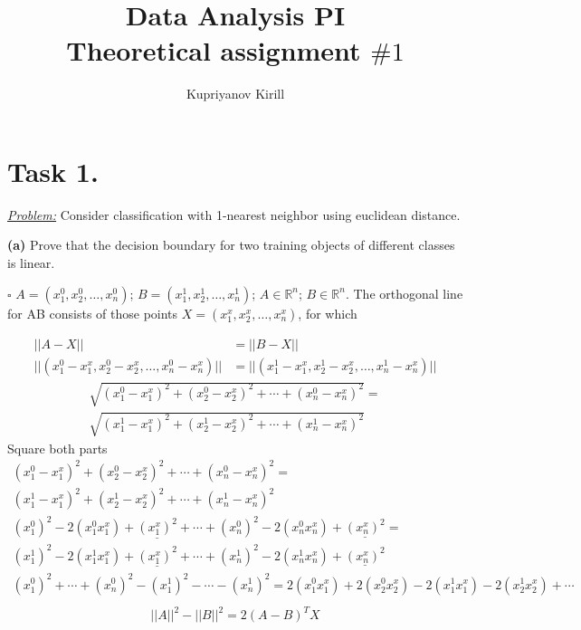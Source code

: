 \documentclass[a4paper,12pt]{article} %
\author{Kupriyanov Kirill}
\title{Data Analysis PI\\Theoretical assignment $\#1$}
\date{}
\begin{document}
\maketitle
\thispagestyle{empty}
\newpage
\section*{Task 1.}
\underline{\textit{Problem:}} Consider classification with 1-nearest neighbor using euclidean distance. \vspace{1.2em}

\textbf{(a)} Prove that the decision boundary for two training objects of different classes is linear.

$\square$  $A=(x_1^0, x_2^0, \dots, x_n^0)$; $B=(x_1^1, x_2^1, \dots, x_n^1)$; $A \in \mathbb{R}^n$; $B \in \mathbb{R}^n$. The orthogonal line for AB consists of those points $X=(x_1^x, x_2^x,  \dots, x_n^x)$, for which 

\begin{align}
||A - X|| &= ||B - X||\\
||(x_1^0 - x_1^x, x_2^0 - x_2^x, \dots, x_n^0 - x_n^x)|| &= ||(x_1^1 - x_1^x, x_2^1 - x_2^x, \dots, x_n^1 - x_n^x)||
\end{align}
\vspace{-1.8em}
\begin{multline*}
\sqrt{(x_1^0 - x_1^x)^2+(x_2^0 - x_2^x)^2+\cdots+(x_n^0 - x_n^x)^2} = \\
\sqrt{(x_1^1 - x_1^x)^2+(x_2^1 - x_2^x)^2+\cdots+(x_n^1 - x_n^x)^2}
\end{multline*}
\vspace{-0.7em}
Square both parts
\begin{multline*}
(x_1^0 - x_1^x)^2+(x_2^0 - x_2^x)^2+\cdots+(x_n^0 - x_n^x)^2 = \\
(x_1^1 - x_1^x)^2+(x_2^1 - x_2^x)^2+\cdots+(x_n^1 - x_n^x)^2\\
(x_1^0)^2 - 2(x_1^0x_1^x) + \underline{(x_1^x)^2} + \cdots + (x_n^0)^2 - 2(x_n^0x_n^x) + \underline{(x_n^x)^2} = \\
(x_1^1)^2 - 2(x_1^1x_1^x) + \underline{(x_1^x)^2} + \cdots + (x_n^1)^2 - 2(x_n^1x_n^x) + \underline{(x_n^x)^2} \\
(x_1^0)^2 + \cdots + (x_n^0)^2 - (x_1^1)^2 - \cdots - (x_n^1)^2 = 2(x_1^0x_1^x) + 2(x_2^0x_2^x) - 2(x_1^1x_1^x) - 2(x_2^1x_2^x) + \cdots  \\
\end{multline*}
\vspace{-2.6em}
\begin{gather*}
||A||^2 - ||B||^2 = {2(A - B)}^T{X}
\end{gather*}
\end{document}
